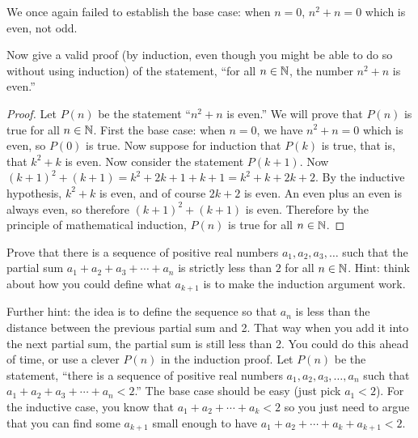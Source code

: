 \begin{questions}
  	\begin{answer}
  		We once again failed to establish the base case: when $n = 0$, $n^2 + n = 0$ which is even, not odd.
  	\end{answer}
  	
  	
  	
  

\question Now give a valid proof (by induction, even though you might be able to do so without using induction) of the statement, ``for all $n \in \mathbb N$, the number $n^2 + n$ is even.''

	\begin{answer}
		  \begin{proof}
		    Let $P(n)$ be the statement ``$n^2 + n$ is even.''  We will prove that $P(n)$ is true for all $n \in \mathbb N$.  First the base case: when $n = 0$, we have $n^2 + n = 0$ which is even, so $P(0)$ is true.  Now suppose for induction that $P(k)$ is true, that is, that $k^2 + k$ is even.  Now consider the statement $P(k+1)$.  Now $(k+1)^2 + (k+1) = k^2 + 2k + 1 + k + 1 = k^2 + k + 2k + 2$.  By the inductive hypothesis, $k^2 + k$ is even, and of course $2k + 2$ is even.  An even plus an even is always even, so therefore $(k+1)^2 + (k+1)$ is even.  Therefore by the principle of mathematical induction, $P(n)$ is true for all $n \in \mathbb N$.
		  \end{proof}
	\end{answer}
	
	
	


\question Prove that there is a sequence of positive real numbers $a_1, a_2, a_3, \ldots$ such that the partial sum $a_1 + a_2 + a_3 + \cdots + a_n$ is strictly less than $2$ for all $n \in \mathbb N$.  Hint: think about how you could define what $a_{k+1}$ is to make the induction argument work.

	\begin{answer}
		 Further hint: the idea is to define the sequence so that $a_n$ is less than the distance between the previous partial sum and 2.  That way when you add it into the next partial sum, the partial sum is still less than 2.  You could do this ahead of time, or use a clever $P(n)$ in the induction proof.  Let $P(n)$ be the statement, ``there is a sequence of positive real numbers $a_1, a_2, a_3, \ldots, a_n$ such that $a_1 + a_2 + a_3 + \cdots + a_n < 2$.''  The base case should be easy (just pick $a_1 < 2$).  For the inductive case, you know that $a_1 + a_2 + \cdots + a_k < 2$ so you just need to argue that you can find some $a_{k+1}$ small enough to have $a_1 + a_2 + \cdots +a_k + a_{k+1} < 2$.
	\end{answer}
	

\end{questions}
